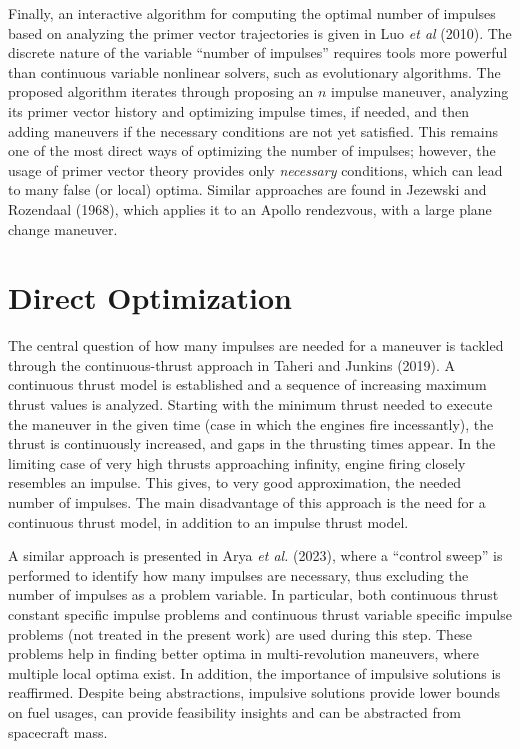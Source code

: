Finally, an interactive algorithm for computing the optimal number of impulses based on analyzing the primer vector trajectories is given in Luo \textit{et al} (2010). The discrete nature of the variable ``number of impulses'' requires tools more powerful than continuous variable nonlinear solvers, such as evolutionary algorithms. The proposed algorithm iterates through proposing an \(n\) impulse maneuver, analyzing its primer vector history and optimizing impulse times, if needed, and then adding maneuvers if the necessary conditions are not yet satisfied. This remains one of the most direct ways of optimizing the number of impulses; however, the usage of primer vector theory provides only \textit{necessary} conditions, which can lead to many false (or local) optima. Similar approaches are found in Jezewski and Rozendaal (1968), which applies it to an Apollo rendezvous, with a large plane change maneuver.

\section{Direct Optimization}

The central question of how many impulses are needed for a maneuver is tackled through the continuous-thrust approach in Taheri and Junkins (2019). A continuous thrust model is established and a sequence of increasing maximum thrust values is analyzed. Starting with the minimum thrust needed to execute the maneuver in the given time (case in which the engines fire incessantly), the thrust is continuously increased, and gaps in the thrusting times appear. In the limiting case of very high thrusts approaching infinity, engine firing closely resembles an impulse. This gives, to very good approximation, the needed number of impulses. The main disadvantage of this approach is the need for a continuous thrust model, in addition to an impulse thrust model. 

A similar approach is presented in Arya \textit{et al.} (2023), where a ``control sweep'' is performed to identify how many impulses are necessary, thus excluding the number of impulses as a problem variable. In particular, both continuous thrust constant specific impulse problems and continuous thrust variable specific impulse problems (not treated in the present work) are used during this step. These problems help in finding better optima in multi-revolution maneuvers, where multiple local optima exist. In addition, the importance of impulsive solutions is reaffirmed. Despite being abstractions, impulsive solutions provide lower bounds on fuel usages, can provide feasibility insights and can be abstracted from spacecraft mass.

